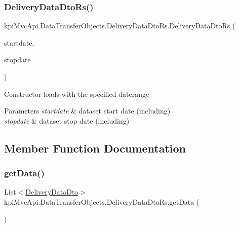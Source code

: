 \subsubsection{\texorpdfstring{Delivery\+Data\+Dto\+Rs()}{DeliveryDataDtoRs()}\hspace{0.1cm}{\footnotesize\ttfamily [6/6]}}
{\footnotesize\ttfamily kpi\+Mvc\+Api.\+Data\+Transfer\+Objects.\+Delivery\+Data\+Dto\+Rs.\+Delivery\+Data\+Dto\+Rs (\begin{DoxyParamCaption}\item[{Date\+Time}]{startdate,  }\item[{Date\+Time}]{stopdate }\end{DoxyParamCaption})\hspace{0.3cm}{\ttfamily [inline]}}



Constructor loads with the specified daterange 


\begin{DoxyParams}{Parameters}
{\em startdate} & dataset start date (including)\\
\hline
{\em stopdate} & dataset stop date (including)\\
\hline
\end{DoxyParams}


\subsection{Member Function Documentation}
\mbox{\label{classkpi_mvc_api_1_1_data_transfer_objects_1_1_delivery_data_dto_rs_a7c771808f4607524b53ee7a65fec5119}} 
\subsubsection{\texorpdfstring{get\+Data()}{getData()}\hspace{0.1cm}{\footnotesize\ttfamily [1/2]}}
{\footnotesize\ttfamily List$<$\hyperlink{classkpi_mvc_api_1_1_data_transfer_objects_1_1_delivery_data_dto}{Delivery\+Data\+Dto}$>$ kpi\+Mvc\+Api.\+Data\+Transfer\+Objects.\+Delivery\+Data\+Dto\+Rs.\+get\+Data (\begin{DoxyParamCaption}{ }\end{DoxyParamCaption})\hspace{0.3cm}{\ttfamily [inline]}}




